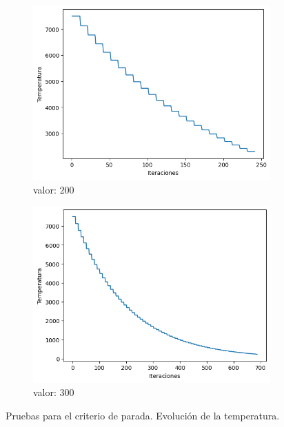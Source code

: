 \documentclass[a4paper,12pt]{article}
\begin{document}
\begin{figure}[H]
\begin{subfigure}{0.24\textwidth}
			\includegraphics[width=\textwidth]{include/parada/200/temp.png}
			\caption{valor: $200$}
		\end{subfigure}
		\hfill
		\begin{subfigure}{0.24\textwidth}
			\centering
			\includegraphics[width=\textwidth]{include/parada/300/temp.png}
			\caption{valor: $300$}
		\end{subfigure}
		\caption{Pruebas para el criterio de parada. Evolución de la temperatura.}
	\end{figure}
	
\end{document}

